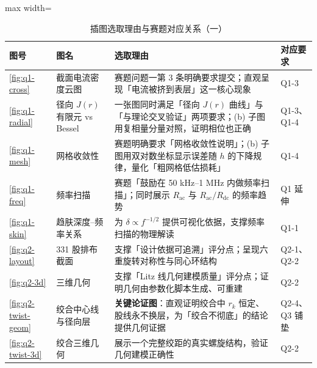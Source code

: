 \documentclass[12pt, a4paper]{ctexart}
\newcommand{\Rac}{R_{\mathrm{ac}}}
\newcommand{\Rdc}{R_{\mathrm{dc}}}
\begin{document}
\begin{table}[H]
\centering
\caption{插图选取理由与赛题对应关系（一）}
\label{tab:appendix-figs}
\small
\begin{adjustbox}{max width=\textwidth}
\begin{tabular}{p{1.15cm} p{2.6cm} p{8.4cm} p{2.15cm}}
\toprule
\textbf{图号} & \textbf{图名} & \textbf{选取理由} & \textbf{对应要求} \\
\midrule
\ref{fig:q1-cross} & 截面电流密度云图 & 赛题问题一第 3 条明确要求提交；直观呈现「电流被挤到表层」这一核心现象 & Q1-3 \\
\ref{fig:q1-radial} & 径向 $J(r)$ 有限元 vs Bessel & 一张图同时满足「径向 $J(r)$ 曲线」与「与理论交叉验证」两项要求；(b) 子图用复相量分量对照，证明相位也正确 & Q1-3、Q1-4 \\
\ref{fig:q1-mesh} & 网格收敛性 & 赛题明确要求「网格收敛性说明」；(b) 子图用双对数坐标显示误差随 $h$ 的下降规律，量化「粗网格低估损耗」 & Q1-4 \\
\ref{fig:q1-freq} & 频率扫描 & 赛题「鼓励在 50 kHz–1 MHz 内做频率扫描」；同时展示 $\Rac$ 与 $\Rac/\Rdc$ 的频率趋势 & Q1 延伸 \\
\ref{fig:q1-skin} & 趋肤深度–频率关系 & 为 $\delta \propto f^{-1/2}$ 提供可视化依据，支撑频率扫描的物理解读 & Q1-1 \\
\ref{fig:q2-layout} & 331 股排布截面 & 支撑「设计依据可追溯」评分点；呈现六重旋转对称性与同心环结构 & Q2-1、Q2-2 \\
\ref{fig:q2-3d} & 三维几何 & 支撑「Litz 线几何建模质量」评分点；证明几何由参数化脚本生成、可重建 & Q2-2 \\
\ref{fig:q2-twist-geom} & 绞合中心线与径向层 & \textbf{关键论证图}：直观证明绞合中 $r_k$ 恒定、股线永不换层，为「绞合不彻底」的结论提供几何证据 & Q2-4、Q3 铺垫 \\
\ref{fig:q2-twist-3d} & 绞合三维几何 & 展示一个完整绞距的真实螺旋结构，验证几何建模正确性 & Q2-2 \\
\bottomrule
\end{tabular}
\end{adjustbox}
\end{table}
\end{document}
